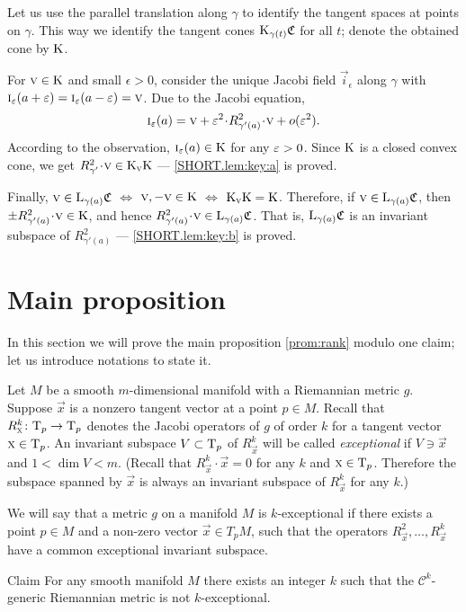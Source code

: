 \documentclass[a4paper,10pt]{article}
\begin{document}
Let us use the parallel translation along $\gamma$ to identify the tangent spaces at points on $\gamma$.
This way we identify the tangent cones $\mathrm{K}_{\gamma(t)}\mathfrak{C}$ for all $t$;
denote the obtained cone by $\mathrm{K}$.

For $\text{\sc{v}}\in \mathrm{K}$ and small $\epsilon>0$, consider the unique Jacobi field $\vec i_\epsilon$ along $\gamma$ with $\vec i_\epsilon (a+\eps)\z=\vec i _\epsilon(a-\eps)=\vec{v}$.
Due to the Jacobi equation,
\[\vec i_\epsilon (a)=\vec{v} +\eps^2\cdot R^2_{\gamma'(a)}\cdot \vec{v} +o(\eps^2).\]
According to the observation, $\text{\sc{i}}_\varepsilon(a)\in \mathrm{K}$ for any $\varepsilon>0$.
Since $\mathrm{K}$ is a closed convex cone, we get $R^2_{\gamma'}\cdot \vec{v}\z\in \K_\vec{v}\K$ --- \ref{SHORT.lem:key:a} is proved.

Finally,
$\text{\sc{v}}\in \mathrm{L}_{\gamma(a)}\mathfrak{C}$ $
\iff$
$\text{\sc{v}}, -\text{\sc{v}}\in \mathrm{K}$
$\iff$
$\mathrm{K}_{\text{\sc{v}}}\mathrm{K}=\mathrm{K}$.
Therefore, if $\text{\sc{v}}\in \mathrm{L}_{\gamma(a)}\mathfrak{C}$, then $\pm R^2_{\gamma'(a)}\cdot \vec{v}\in \K$, and hence $R^2_{\gamma'(a)}\cdot \vec{v}\in \L_{\gamma(a)}\mathfrak{C}$.
That is, $\mathrm{L}_{\gamma(a)}\mathfrak{C}$ is an invariant subspace of $R^2_{\gamma'(a)}$ --- \ref{SHORT.lem:key:b} is proved.
\qeds

\section{Main proposition}

In this section we will prove the main proposition \ref{prom:rank} modulo one claim; let us introduce notations to state it.

Let $M$ be a smooth $m$-dimensional manifold with a Riemannian metric $g$.
Suppose $\vec x$ is a nonzero tangent vector at a point $p\in M$.
Recall that $R^k_{\text{\sc{x}}}\colon\mathrm{T}_p\to\mathrm{T}_p$ denotes the Jacobi operators of $g$ of order $k$ for a tangent vector $\text{\sc{x}}\in\mathrm{T}_p$.
An invariant subspace $V\subset \mathrm{T}_p$ of $R^k_\vec x$ will be called \emph{exceptional} if $V\ni \vec x$ and $1< \dim V<m$.
(Recall that $R^k_\vec x\cdot \vec x=0$
for any $k$ and $\text{\sc{x}}\in \mathrm{T}_p$.
Therefore the subspace spanned by $\vec x$ is always an invariant subspace of $R^k_\vec x$ for any $k$.)

We will  say that a metric $g$ on a manifold $M$ is $k$-exceptional if there exists a point $p\in M$ and a non-zero vector $\vec x\in T_p M$,
such that the operators   $R^2_\vec x,\dots, R^k _\vec x$ have a common exceptional invariant subspace.  

\begin{thm}{Claim}\label{clm:codim-sigma} 
For any smooth manifold $M$ there exists an integer $k$ such that the 
$\mathcal C^k$-generic Riemannian metric is not $k$-exceptional.
\end{thm}
\end{document}
